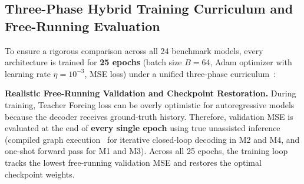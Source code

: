 \documentclass[10pt,a4paper]{article}
\begin{document}
\subsection{Three-Phase Hybrid Training Curriculum and Free-Running Evaluation}
To ensure a rigorous comparison across all 24 benchmark models, every architecture is trained for \textbf{25 epochs} (batch size $B = 64$, Adam optimizer with learning rate $\eta = 10^{-3}$, MSE loss) under a unified three-phase curriculum~\cite{bengio2009}:

\begin{table}[!htbp]
    \centering
    \small
    \caption{Three-phase hybrid training curriculum applied across all 24 benchmark models.}
    \label{tab:training_phases}
\end{table}

\textbf{Realistic Free-Running Validation and Checkpoint Restoration.} During training, Teacher Forcing loss can be overly optimistic for autoregressive models because the decoder receives ground-truth history. Therefore, validation MSE is evaluated at the end of \textbf{every single epoch} using true unassisted inference (compiled graph execution~\cite{tf2024} for iterative closed-loop decoding in M2 and M4, and one-shot forward pass for M1 and M3). Across all 25 epochs, the training loop tracks the lowest free-running validation MSE and restores the optimal checkpoint weights.
\end{document}

